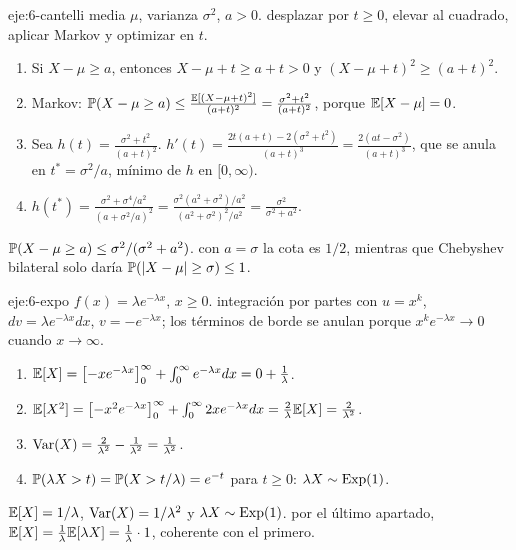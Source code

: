 \begin{solucion}{eje:6-cantelli}
\datos media $\mu$, varianza $\sigma^{2}$, $a>0$.
\planteamiento desplazar por $t\ge0$, elevar al cuadrado, aplicar Markov y optimizar en $t$.
\pasos
\begin{enumerate}[label=\arabic*.]
  \item Si $X-\mu\ge a$, entonces $X-\mu+t\ge a+t>0$ y $(X-\mu+t)^{2}\ge(a+t)^{2}$.
  \item Markov: $\mathbb{P}(X-\mu\ge a)\le\frac{\mathbb{E}[(X-\mu+t)^{2}]}{(a+t)^{2}}=\frac{\sigma^{2}+t^{2}}{(a+t)^{2}}$, porque $\mathbb{E}[X-\mu]=0$.
  \item Sea $h(t)=\frac{\sigma^{2}+t^{2}}{(a+t)^{2}}$. $h'(t)=\frac{2t(a+t)-2(\sigma^{2}+t^{2})}{(a+t)^{3}}=\frac{2(at-\sigma^{2})}{(a+t)^{3}}$, que se anula en $t^{*}=\sigma^{2}/a$, mínimo de $h$ en $[0,\infty)$.
  \item $h(t^{*})=\frac{\sigma^{2}+\sigma^{4}/a^{2}}{(a+\sigma^{2}/a)^{2}}=\frac{\sigma^{2}(a^{2}+\sigma^{2})/a^{2}}{(a^{2}+\sigma^{2})^{2}/a^{2}}=\frac{\sigma^{2}}{\sigma^{2}+a^{2}}$.
\end{enumerate}
\resultado $\mathbb{P}(X-\mu\ge a)\le\sigma^{2}/(\sigma^{2}+a^{2})$.
\comprobacion con $a=\sigma$ la cota es $1/2$, mientras que Chebyshev bilateral solo daría $\mathbb{P}(\lvert X-\mu\rvert\ge\sigma)\le1$.
\end{solucion}

\begin{solucion}{eje:6-expo}
\datos $f(x)=\lambda e^{-\lambda x}$, $x\ge0$.
\planteamiento integración por partes con $u=x^{k}$, $dv=\lambda e^{-\lambda x}dx$, $v=-e^{-\lambda x}$; los términos de borde se anulan porque $x^{k}e^{-\lambda x}\to0$ cuando $x\to\infty$.
\pasos
\begin{enumerate}[label=\arabic*.]
  \item $\mathbb{E}[X]=\bigl[-xe^{-\lambda x}\bigr]_0^\infty+\int_0^\infty e^{-\lambda x}dx=0+\frac1\lambda$.
  \item $\mathbb{E}[X^{2}]=\bigl[-x^{2}e^{-\lambda x}\bigr]_0^\infty+\int_0^\infty2xe^{-\lambda x}dx=\frac2\lambda\mathbb{E}[X]=\frac2{\lambda^{2}}$.
  \item $\operatorname{Var}(X)=\frac2{\lambda^{2}}-\frac1{\lambda^{2}}=\frac1{\lambda^{2}}$.
  \item $\mathbb{P}(\lambda X>t)=\mathbb{P}(X>t/\lambda)=e^{-t}$ para $t\ge0$: $\lambda X\sim\operatorname{Exp}(1)$.
\end{enumerate}
\resultado $\mathbb{E}[X]=1/\lambda$, $\operatorname{Var}(X)=1/\lambda^{2}$ y $\lambda X\sim\operatorname{Exp}(1)$.
\comprobacion por el último apartado, $\mathbb{E}[X]=\frac1\lambda\mathbb{E}[\lambda X]=\frac1\lambda\cdot1$, coherente con el primero.
\end{solucion}

